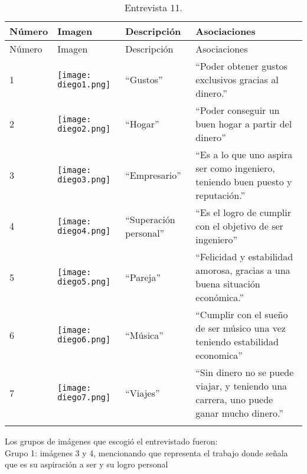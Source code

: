 \begin{longtable}{>{\centering\arraybackslash}m{1cm} >{\centering\arraybackslash}m{2cm} >{\arraybackslash}m{5cm}>{\arraybackslash}m{5cm}}
	
	\hline
	Número & Imagen & Descripción & Asociaciones \\
	\hline \hline
	\endfirsthead
	
	\hline
	Número & Imagen & Descripción & Asociaciones \\
	\hline \hline
	\endhead

1 & \texttt{[image: diego1.png]} & ``Gustos'' & ``Poder obtener gustos exclusivos gracias al dinero.'' \\
\hline

2 & \texttt{[image: diego2.png]} & ``Hogar'' & ``Poder conseguir un buen hogar a partir del dinero'' \\
\hline

3 & \texttt{[image: diego3.png]} & ``Empresario'' & ``Es a lo que uno aspira ser como ingeniero, teniendo buen puesto y reputación.'' \\
\hline

4 & \texttt{[image: diego4.png]} & ``Superación personal'' & ``Es el logro de cumplir con el objetivo de ser ingeniero'' \\
\hline

5 & \texttt{[image: diego5.png]} & ``Pareja'' & ``Felicidad y estabilidad amorosa, gracias a una buena situación económica.'' \\
\hline

6 & \texttt{[image: diego6.png]} & ``Música'' & ``Cumplir con el sueño de ser músico una vez teniendo estabilidad economica'' \\
\hline

7 & \texttt{[image: diego7.png]} & ``Viajes'' & ``Sin dinero no se puede viajar, y teniendo una carrera, uno puede ganar mucho dinero.'' \\
\hline

\caption{Entrevista 11.}
\label{tabla:diego}
\end{longtable}

Los grupos de imágenes que escogió el entrevistado fueron:\\

Grupo 1: imágenes 3 y 4, mencionando que representa el  trabajo donde señala que es su aspiración a ser y su logro personal\\

